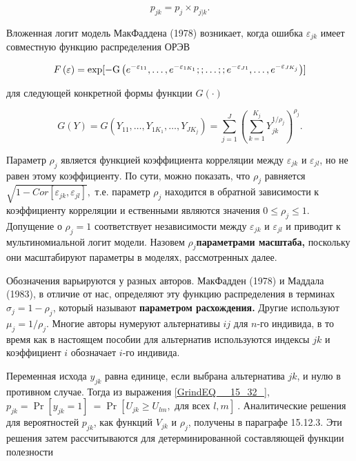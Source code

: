 \[p_{jk}=p_j\times p_{j|k}.\] 

Вложенная логит модель МакФаддена (1978) возникает, когда ошибка ${\varepsilon }_{jk}$ имеет совместную функцию распределения ОРЭВ

\begin{equation} \label{GrindEQ__15_33_} F\left(\varepsilon \right)={\rm exp}{\rm [-}{\rm G}\left(e^{-{\varepsilon }_{11}},\dots ,e^{-{\varepsilon }_{1K_1}};;\dots ;;e^{-{\varepsilon }_{J1}},\dots ,e^{-{\varepsilon }_{JK_j}}\right)] \end{equation} 

для следующей конкретной формы функции $G\left(\cdot \right)$

\begin{equation} \label{GrindEQ__15_34_} G\left(Y\right)=G\left(Y_{11},\dots ,Y_{1K_1},\dots ,Y_{JK_j}\right)=\sum^J_{j=1}{{\left(\sum^{K_j}_{k=1}{Y^{{1}/{{\rho }_j}}_{jk}}\right)}^{{\rho }_j}.} \end{equation} 

Параметр ${\rho }_j$ является функцией коэффициента корреляции между ${\varepsilon }_{jk}$ и ${\varepsilon }_{jl}$, но не равен этому коэффициенту. По сути, можно показать, что ${\rho }_j$ равняется $\sqrt{1-Cor[{\varepsilon }_{jk},{\varepsilon }_{jl}]},$ т.е. параметр ${\rho }_j$ находится в обратной зависимости к коэффициенту корреляции и ественными являются значения $0\le {\rho }_j\le 1.$ Допущение о ${\rho }_j=1$ соответствует независимости между ${\varepsilon }_{jk}$ и ${\varepsilon }_{jl}$ и приводит к  мультиномиальной логит модели. Назовем ${\rho }_j$\textbf{параметрами масштаба, } поскольку они масштабируют параметры в моделях, рассмотренных далее.

Обозначения варьируются у разных авторов. МакФадден (1978) и Маддала (1983), в отличие от нас, определяют эту функцию распределения в терминах ${\sigma }_j=1-{\rho }_j$, который называют \textbf{параметром расхождения. } Другие используют ${\mu }_j={1}/{{\rho }_j}$. Многие авторы нумеруют альтернативы $ij$ для $n$-го индивида, в то время как в настоящем пособии для альтернатив используются индексы $jk$ и коэффициент $i$ обозначает $i$-го индивида.

Переменная исхода $y_{jk}$ равна единице, если выбрана альтернатива $jk$, и нулю в противном случае. Тогда из выражения \eqref{GrindEQ__15_32_}, $p_{jk}={\Pr  \left[y_{jk}=1\right]\ }={\Pr  \left[U_{jk}\ge U_{lm},\text{ для всех } l,m\right]\ }.$ Аналитические решения для вероятностей $p_{jk}$, как функций $V_{jk}$ и ${\rho }_j$, получены в параграфе 15.12.3. Эти решения затем рассчитываются для детерминированной составляющей функции полезности 

